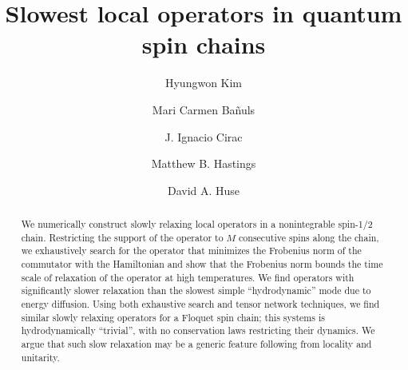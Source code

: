 \documentclass[twocolumn,superscriptaddress, prl,showpacs]{revtex4-1}
\begin{document}
\title{Slowest local operators in quantum spin chains}

\author{Hyungwon Kim}

\author{Mari Carmen Ba\~{n}uls}

\author{J. Ignacio Cirac}

\author{Matthew B. Hastings}

\author{David A. Huse}

\begin{abstract}
We numerically construct slowly relaxing local operators in a nonintegrable spin-1/2 chain.
Restricting the support of the operator to $M$ consecutive spins along the chain,
we exhaustively search for the operator that minimizes the Frobenius norm of the commutator
with the Hamiltonian and show that the Frobenius norm bounds the time scale of relaxation of the operator 
at high temperatures.
We find operators with significantly slower relaxation than
the slowest simple ``hydrodynamic'' mode due to energy diffusion.
Using both exhaustive search and tensor network techniques, we find
similar slowly relaxing operators for a Floquet spin chain; %
this systems is hydrodynamically ``trivial'', with no conservation laws restricting their dynamics.
We argue that such slow relaxation may be a generic feature following from locality and unitarity.
\end{abstract}


\maketitle
\end{document}

